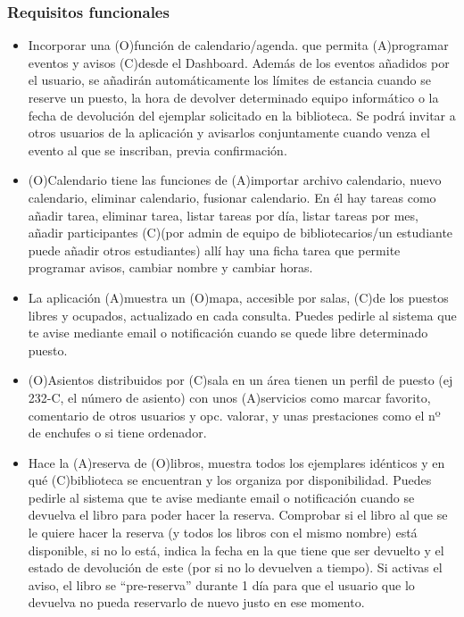\documentclass[12pt]{article}
\begin{document}
\subsubsection{Requisitos funcionales}
\begin{itemize}[noitemsep]
\item Incorporar una (O)función de calendario/agenda. que permita (A)programar eventos y avisos (C)desde el Dashboard.
\subitem Además de los eventos añadidos por el usuario, se añadirán automáticamente los límites de estancia cuando se reserve un puesto, la hora de devolver determinado equipo informático o la fecha de devolución del ejemplar solicitado en la biblioteca.
\subitem Se podrá invitar a otros usuarios de la aplicación y avisarlos conjuntamente cuando venza el evento al que se inscriban, previa confirmación.
\item (O)Calendario tiene las funciones de (A)importar archivo calendario, nuevo calendario, eliminar calendario, fusionar calendario. En él hay tareas como añadir tarea, eliminar tarea, listar tareas por día, listar tareas por mes, añadir participantes (C)(por admin de equipo de bibliotecarios/un estudiante puede añadir otros estudiantes) allí hay una ficha tarea que permite programar avisos, cambiar nombre y cambiar horas.
\item La aplicación (A)muestra un (O)mapa, accesible  por salas, (C)de los puestos libres y ocupados, actualizado en cada consulta.
\subitem Puedes pedirle al sistema que te avise mediante email o notificación cuando se quede libre determinado puesto.
\item (O)Asientos distribuidos por (C)sala en un área tienen un perfil de puesto (ej 232-C, el número de asiento) con unos (A)servicios como marcar favorito, comentario de otros usuarios y opc. valorar, y unas prestaciones como el nº de enchufes o si tiene ordenador.
\item Hace la (A)reserva de (O)libros, muestra todos los ejemplares idénticos y en qué (C)biblioteca se encuentran y los organiza por disponibilidad.
\subitem Puedes pedirle al sistema que te avise mediante email o notificación cuando se devuelva el libro para poder hacer la reserva. 
\subitem Comprobar si el libro al que se le quiere hacer la reserva (y todos los libros con el mismo nombre) está disponible, si no lo está, indica la fecha en la que tiene que ser devuelto y el estado de devolución de este (por si no lo devuelven a tiempo).
\subitem Si activas el aviso, el libro se “pre-reserva” durante 1 día para que el usuario que lo devuelva no pueda reservarlo de nuevo justo en ese momento.

\end{itemize}
\end{document}
